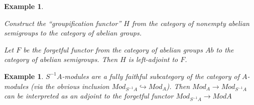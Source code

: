 \documentclass{article}
\newtheorem{example}[theorem]{Example}
\begin{document}
\begin{example}
\begin{center}
\begin{tikzpicture}[x=0.75pt,y=0.75pt,yscale=-1,xscale=1]
\end{tikzpicture}
    \end{center}
    Construct the “groupification functor” $H$ from the category of nonempty abelian semigroups to the category of abelian groups.

    Let $F$ be the forgetful functor from the category of abelian groups $Ab$ to the category of abelian semigroups. Then $H$ is left-adjoint to $F$.
\end{example}
\begin{example}
    $S^{-1}A$-modules are a fully faithful subcategory of the category of $A$-modules (via the obvious inclusion $Mod_{S^{-1}A} \hookrightarrow Mod_A$). Then $Mod_A \rightarrow Mod_{S^{-1}A}$ can be interpreted as an adjoint to the forgetful functor $Mod_{S^{-1}A} \rightarrow ModA$
\end{example}
\end{document}
